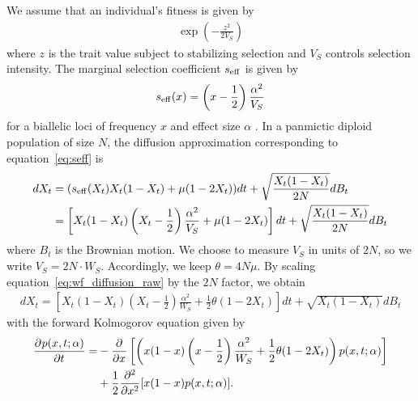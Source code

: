\documentclass[10pt]{article}
\begin{document}
We assume that an individual's fitness is given by
\begin{align}
    \exp \left(
        -\frac{z^2}{2V_S} 
    \right)
\end{align}
where $z$ is the trait value subject to stabilizing selection and $V_S$ controls selection intensity.
The marginal selection coefficient $\seff$ is given by
\begin{align} \label{eq:seff}
    \seff(x) = \left(x-\frac{1}{2}\right)\frac{\alpha^2}{V_S}
\end{align}
for a biallelic loci of frequency $x$ and effect size $\alpha$ \citep{Robertson1956againstextreme,Lande1976phenoevolution,Simons2018popgeninterpretation, Negm2024longrangeld}.
In a panmictic diploid population of size $N$,
the diffusion approximation corresponding to equation~\ref{eq:seff} is
\begin{align} \label{eq:wf_diffusion_raw}
    \begin{aligned}
    dX_t &= (\seff(X_t)X_t(1-X_t) + \mu(1-2X_t))dt + \sqrt{\frac{X_t(1-X_t)}{2N}}dB_t \\
    &= \left[ X_t(1-X_t)\left(X_t-\frac{1}{2}\right)\frac{\alpha^2}{V_S}
    + \mu(1-2X_t) 
    \right] 
    dt + \sqrt{\frac{X_t(1-X_t)}{2N}}dB_t
    \end{aligned}
\end{align}
where $B_t$ is the Brownian motion.
We choose to measure $V_S$ in units of $2N$,
so we write $V_S = 2N \cdot W_S$.
Accordingly, we keep $\theta = 4N\mu$.
By scaling equation~\ref{eq:wf_diffusion_raw} by the $2N$ factor,
we obtain
\begin{align} \label{eq:wf_diffusion_scaled}
    dX_t = \left[
    X_t(1-X_t)\left(X_t-\frac{1}{2}\right)\frac{\alpha^2}{W_S} 
    + \frac{1}{2}\theta(1-2X_t)
    \right] 
    dt + \sqrt{X_t(1-X_t)}dB_t   
\end{align}
with the forward Kolmogorov equation given by
\begin{align} \label{eq:fwd_kolmogorov_scaled}
    \begin{aligned}
     \pard{p(x,t;\alpha)}{t} 
     =& -\pard{}{x} 
     \left[
     \left(
        x(1-x)\left(x-\frac{1}{2}\right)
        \frac{\alpha^2}{W_S}
        + \frac{1}{2}\theta(1-2X_t)
        \right)
        p(x,t;\alpha)
     \right] \\
     &+\frac{1}{2} \pard[2]{}{x}[x(1-x)p(x,t;\alpha)].
     \end{aligned}
\end{align}
\end{document}
